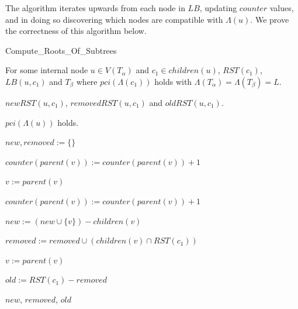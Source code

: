 \documentclass{article}
\newcommand{\leafset}{\Lambda}
\begin{document}
    The algorithm iterates upwards from each node in $LB$, updating $counter$ values, and in doing so discovering which nodes are compatible with $\leafset(u)$. We prove the correctness of this algorithm below.

    \begin{algorithm}
        \caption{Compute\_Roots\_Of\_Subtrees}
        \label{alg:computerootsofsubtrees}

        \begin{algorithmic}[1]
            \Input For some internal node $u \in V(T_\alpha)$ and $c_1 \in children(u)$, $RST(c_1)$, $LB(u, c_1)$ and $T_\beta$ where $pci(\leafset(c_1))$ holds with $\leafset(T_\alpha) = \leafset(T_\beta) = L$.

            \Output $newRST(u, c_1)$, $removedRST(u, c_1)$ and $oldRST(u, c_1)$.

            \SideEffect $pci(\leafset(u))$ holds.

            \State $new, removed := \{\}$

                \State $counter(parent(v)) := counter(parent(v)) + 1$

                \State $v := parent(v)$

                    \State $counter(parent(v)) := counter(parent(v)) + 1$

                    \State $new := (new \cup \{v\}) - children(v)$

                    \State $removed := removed \cup (children(v) \cap RST(c_1))$

                    \State $v := parent(v)$
                \EndWhile
            \EndFor

            \State $old := RST(c_1) - removed$

            \State \Return $new$, $removed$, $old$
        \end{algorithmic}
    \end{algorithm}
\end{document}
